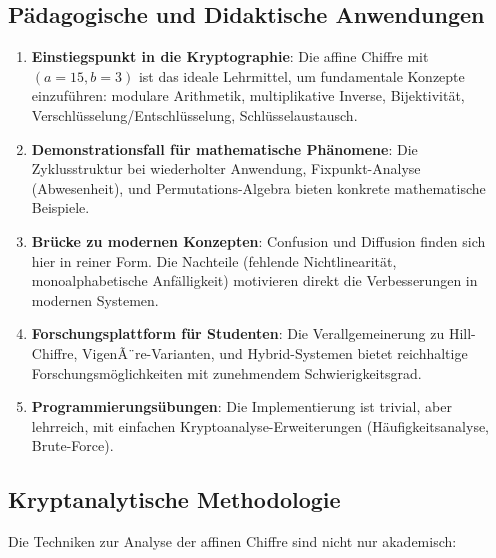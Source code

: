 ﻿\documentclass[12pt,a4paper]{article}
\begin{document}
	\subsection{Pädagogische und Didaktische Anwendungen}
	
	\begin{enumerate}
		\item \textbf{Einstiegspunkt in die Kryptographie}: Die affine Chiffre mit $(a=15, b=3)$ ist das ideale Lehrmittel, um fundamentale Konzepte einzuführen: modulare Arithmetik, multiplikative Inverse, Bijektivität, Verschlüsselung/Entschlüsselung, Schlüsselaustausch.
		
		\item \textbf{Demonstrationsfall für mathematische Phänomene}: Die Zyklusstruktur bei wiederholter Anwendung, Fixpunkt-Analyse (Abwesenheit), und Permutations-Algebra bieten konkrete mathematische Beispiele.
		
		\item \textbf{Brücke zu modernen Konzepten}: Confusion und Diffusion finden sich hier in reiner Form. Die Nachteile (fehlende Nichtlinearität, monoalphabetische Anfälligkeit) motivieren direkt die Verbesserungen in modernen Systemen.
		
		\item \textbf{Forschungsplattform für Studenten}: Die Verallgemeinerung zu Hill-Chiffre, VigenÃ¨re-Varianten, und Hybrid-Systemen bietet reichhaltige Forschungsmöglichkeiten mit zunehmendem Schwierigkeitsgrad.
		
		\item \textbf{Programmierungsübungen}: Die Implementierung ist trivial, aber lehrreich, mit einfachen Kryptoanalyse-Erweiterungen (Häufigkeitsanalyse, Brute-Force).
	\end{enumerate}
	
	\subsection{Kryptanalytische Methodologie}
	
	Die Techniken zur Analyse der affinen Chiffre sind nicht nur akademisch:
	
\end{document}

